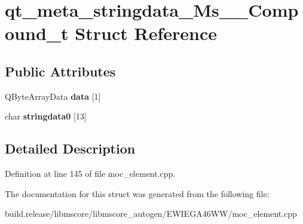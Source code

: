 \hypertarget{structqt__meta__stringdata___ms_____compound__t}{}\section{qt\+\_\+meta\+\_\+stringdata\+\_\+\+Ms\+\_\+\+\_\+\+Compound\+\_\+t Struct Reference}
\label{structqt__meta__stringdata___ms_____compound__t}
\subsection*{Public Attributes}
\begin{DoxyCompactItemize}
\item 
\mbox{\label{structqt__meta__stringdata___ms_____compound__t_a258e412aec0b12384558ed7aa7f9c3e9}} 
Q\+Byte\+Array\+Data {\bfseries data} \mbox{[}1\mbox{]}
\item 
\mbox{\label{structqt__meta__stringdata___ms_____compound__t_aa9bcd6f5391b4e3d138e43a3e3d3664e}} 
char {\bfseries stringdata0} \mbox{[}13\mbox{]}
\end{DoxyCompactItemize}


\subsection{Detailed Description}


Definition at line 145 of file moc\+\_\+element.\+cpp.



The documentation for this struct was generated from the following file\+:\begin{DoxyCompactItemize}
\item 
build.\+release/libmscore/libmscore\+\_\+autogen/\+E\+W\+I\+E\+G\+A46\+W\+W/moc\+\_\+element.\+cpp\end{DoxyCompactItemize}
